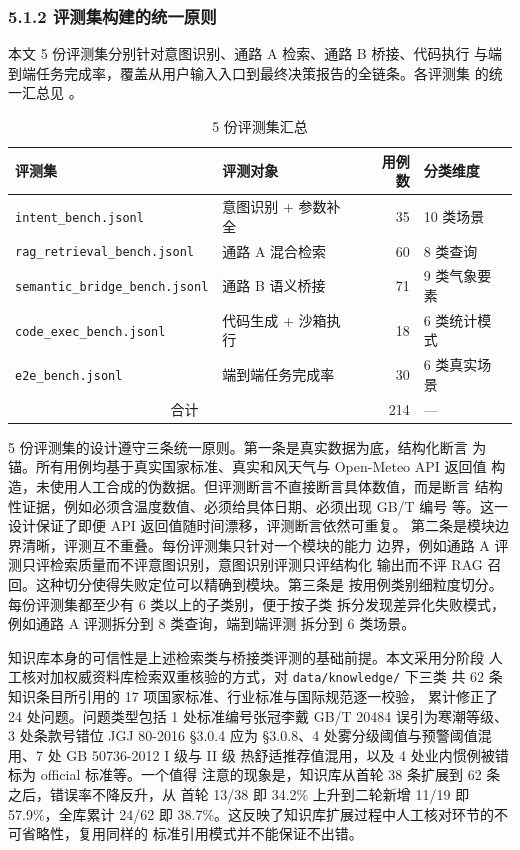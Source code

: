 \subsubsection*{5.1.2 \quad 评测集构建的统一原则}

本文 5 份评测集分别针对意图识别、通路 A 检索、通路 B 桥接、代码执行
与端到端任务完成率，覆盖从用户输入入口到最终决策报告的全链条。各评测集
的统一汇总见 。

\begin{table}[H]
    \centering
    \caption{5 份评测集汇总}
    \label{tab:dataset-overview}
    \song\fontsize{9pt}{12pt}\selectfont
    \renewcommand{\arraystretch}{0.95}
    \begin{tabular}{llrl}
        \toprule
        评测集 & 评测对象 & 用例数 & 分类维度 \\
        \midrule
        \texttt{intent\_bench.jsonl} & 意图识别 + 参数补全 & 35 & 10 类场景 \\
        \texttt{rag\_retrieval\_bench.jsonl} & 通路 A 混合检索 & 60 & 8 类查询 \\
        \texttt{semantic\_bridge\_bench.jsonl} & 通路 B 语义桥接 & 71 & 9 类气象要素 \\
        \texttt{code\_exec\_bench.jsonl} & 代码生成 + 沙箱执行 & 18 & 6 类统计模式 \\
        \texttt{e2e\_bench.jsonl} & 端到端任务完成率 & 30 & 6 类真实场景 \\
        \midrule
        \multicolumn{2}{c}{合计} & 214 & --- \\
        \bottomrule
    \end{tabular}
\end{table}

5 份评测集的设计遵守三条统一原则。第一条是真实数据为底，结构化断言
为锚。所有用例均基于真实国家标准、真实和风天气与 Open-Meteo API 返回值
构造，未使用人工合成的伪数据。但评测断言不直接断言具体数值，而是断言
结构性证据，例如必须含温度数值、必须给具体日期、必须出现 GB/T 编号
等。这一设计保证了即便 API 返回值随时间漂移，评测断言依然可重复。
第二条是模块边界清晰，评测互不重叠。每份评测集只针对一个模块的能力
边界，例如通路 A 评测只评检索质量而不评意图识别，意图识别评测只评结构化
输出而不评 RAG 召回。这种切分使得失败定位可以精确到模块。第三条是
按用例类别细粒度切分。每份评测集都至少有 6 类以上的子类别，便于按子类
拆分发现差异化失败模式，例如通路 A 评测拆分到 8 类查询，端到端评测
拆分到 6 类场景。

知识库本身的可信性是上述检索类与桥接类评测的基础前提。本文采用分阶段
人工核对加权威资料库检索双重核验的方式，对 \texttt{data/knowledge/} 下三类
共 62 条知识条目所引用的 17 项国家标准、行业标准与国际规范逐一校验，
累计修正了 24 处问题。问题类型包括 1 处标准编号张冠李戴
GB/T 20484 误引为寒潮等级、3 处条款号错位 JGJ 80-2016 §3.0.4 应为
§3.0.8、4 处雾分级阈值与预警阈值混用、7 处 GB 50736-2012 I 级与 II 级
热舒适推荐值混用，以及 4 处业内惯例被错标为 official 标准等。一个值得
注意的现象是，知识库从首轮 38 条扩展到 62 条之后，错误率不降反升，从
首轮 13/38 即 34.2\% 上升到二轮新增 11/19 即 57.9\%，全库累计 24/62 即
38.7\%。这反映了知识库扩展过程中人工核对环节的不可省略性，复用同样的
标准引用模式并不能保证不出错。

